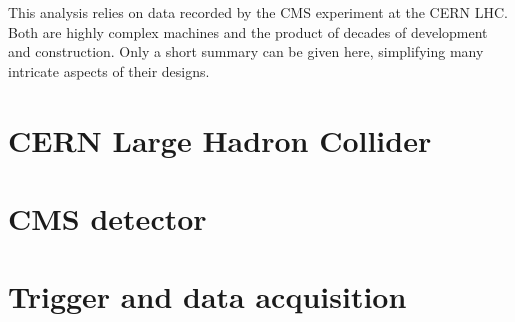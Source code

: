 \label{sec:setup}
This analysis relies on data recorded by the CMS experiment at the CERN LHC. Both are highly complex machines and the product of decades of development and construction. Only a short summary can be given here, simplifying many intricate aspects of their designs.
\section{CERN Large Hadron Collider}

\section{CMS detector}

\section{Trigger and data acquisition}
\label{sec:trigger}
